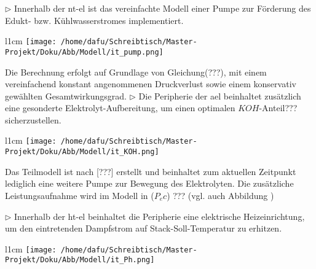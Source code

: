 \documentclass[onecolumn,10pt,titlepage]{article}
\begin{document}
$\triangleright$ Innerhalb der \gls{nt}-\gls{el} ist das vereinfachte Modell einer Pumpe zur Förderung des Edukt- bzw. Kühlwasserstromes implementiert.
\begin{wrapfigure}{l}{1cm}
	\texttt{[image: /home/dafu/Schreibtisch/Master-Projekt/Doku/Abb/Modell/it\_pump.png]}
\end{wrapfigure} Die Berechnung erfolgt auf Grundlage von Gleichung(???), mit einem vereinfachend konstant angenommenen Druckverlust sowie einem konservativ gewählten Gesamtwirkungsgrad.
\newline
$\triangleright$ Die Peripherie der \gls{ael} beinhaltet zusätzlich eine gesonderte Elektrolyt-Aufbereitung, um einen optimalen $KOH$-Anteil??? sicherzustellen. 
\begin{wrapfigure}{l}{1cm}
	\texttt{[image: /home/dafu/Schreibtisch/Master-Projekt/Doku/Abb/Modell/it\_KOH.png]}
\end{wrapfigure}
Das Teilmodell ist nach [???] erstellt und beinhaltet zum aktuellen Zeitpunkt lediglich eine weitere Pumpe zur Bewegung des Elektrolyten. Die zusätzliche Leistungsaufnahme wird im Modell in ($P_ec$) ??? (vgl. auch Abbildung  )
\newline

$\triangleright$ Innerhalb der \gls{ht}-\gls{el} beinhaltet die Peripherie eine elektrische Heizeinrichtung, um den eintretenden Dampfstrom auf Stack-Soll-Temperatur zu erhitzen.
\begin{wrapfigure}{l}{1cm}
	\texttt{[image: /home/dafu/Schreibtisch/Master-Projekt/Doku/Abb/Modell/it\_Ph.png]}
\end{wrapfigure}
\end{document}
